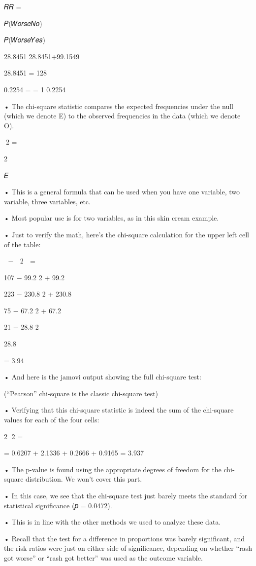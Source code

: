 \documentclass[
  letterpaper,
  DIV=11,
  numbers=noendperiod]{scrreprt}
\begin{document}
𝑅𝑅 =

𝑃(𝑊𝑜𝑟𝑠𝑒\textbar 𝑁𝑜)

𝑃(𝑊𝑜𝑟𝑠𝑒\textbar 𝑌𝑒𝑠)

28.8451 28.8451+99.1549

28.8451 = 128

0.2254 = = 1 0.2254

• The chi-square statistic compares the expected frequencies under the
null (which we denote E) to the observed frequencies in the data (which
we denote O).

𝜒2 = ෍

2

𝐸

• This is a general formula that can be used when you have one variable,
two variable, three variables, etc.

• Most popular use is for two variables, as in this skin cream example.

• Just to verify the math, here's the chi-square calculation for the
upper left cell of the table:

𝑂 − 𝐸 2 ෍ = 𝐸

107 − 99.2 2 + 99.2

223 − 230.8 2 + 230.8

75 − 67.2 2 + 67.2

21 − 28.8 2

28.8

= 3.94

• And here is the jamovi output showing the full chi-square test:

(``Pearson'' chi-square is the classic chi-square test)

• Verifying that this chi-square statistic is indeed the sum of the
chi-square values for each of the four cells:

2 𝜒2 = ෍ 𝐸

= 0.6207 + 2.1336 + 0.2666 + 0.9165 = 3.937

• The p-value is found using the appropriate degrees of freedom for the
chi-square distribution. We won't cover this part.

• In this case, we see that the chi-square test just barely meets the
standard for statistical significance (𝑝 = 0.0472).

• This is in line with the other methods we used to analyze these data.

• Recall that the test for a difference in proportions was barely
significant, and the risk ratios were just on either side of
significance, depending on whether ``rash got worse'' or ``rash got
better'' was used as the outcome variable.
\end{document}
